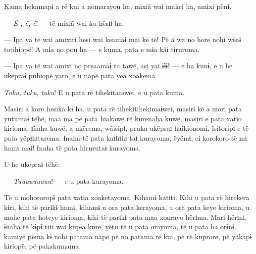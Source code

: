 Kama hekamapɨ a rë kui a nomarayou ha, mixiã wai makei ha, amixi pënɨ. 

--- \textit{Ẽ , ẽ, ẽ}! --- të mixiã wai ku hërɨɨ ha. 


--- Ipa ya të wai amixiri hesi wai keamaɨ mai kë të! Pë ã wa no hore nohi
wëaɨ totihiopë! A mɨa no pou ha --- e kuma, pata e mɨa kãi tiruroma. 


--- Ipa ya të wai amixi no preaamaɨ ta tawë, asi yai ɨ̃ɨɨ! --- e ha kunɨ, e
u he ukëpraɨ puhiopë yaro, e u napë pata yëa xoakema. 

\textit{Tuku, tuku, tuku}! E u pata rë tihekitaaɨwei, e u pata kuma. 

Masiri a koro hesika kɨ ha, u pata rë tihekitihekimaɨwei, masiri kë a
mori pata yutumaɨ tëhë, maa ma pë pata hiakawë rë kurenaha kuwë, masiri
e pata xatio kirioma, ɨ̃naha kuwë, a ukërema, wãisipɨ, pruka ukëpraɨ
haikionomi, ĩsitoripɨ e të pata yëpɨhɨtarema. Ɨnaha të pata kaɨhɨhɨ taɨ
kurayoma, ëyëmɨ, ei korokoro të mɨ hamɨ mai! Ɨnaha të pata hirurutaɨ
kurayoma. 

U he ukëpraɨ tëhë: 

--- \textit{Tuuuuuuuuu}! --- e u pata kurayoma. 

Të u mohororopɨ pata xatia xoaketayoma. Kihamɨ katiti. Kihi u pata rë
hirekera kiri, kihi të parɨkɨ hamɨ, kihamɨ u ora pata kerayoma, u ora
pata keye kirioma, u mohe pata hoteye kirioma, kihi të parɨkɨ pata maa
xoarayo hërɨma. Marɨ hërɨnɨ, ɨnaha të kɨpɨ titi wai kupɨa kure, yëtu të
u pata orayoma, të u pata ha orɨnɨ, kamiyë pëma kɨ nohi patama napë pë
no patama rë kui, pë rë kuprore, pë yãkapɨ kiriopë, pë pakakumama. 


